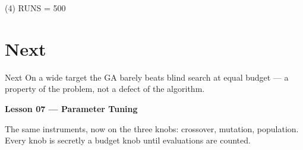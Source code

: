 \begin{frame}[fragile]{(4) RUNS = 500}

\end{frame}


\section{Next}

\begin{frame}{Next}
On a wide target the GA barely beats blind search at equal budget --- a property of the problem, not a defect of the algorithm.

\vspace{0.8em}
\textbf{Lesson 07 --- Parameter Tuning}

The same instruments, now on the three knobs: crossover, mutation, population. Every knob is secretly a budget knob until evaluations are counted.
\end{frame}

